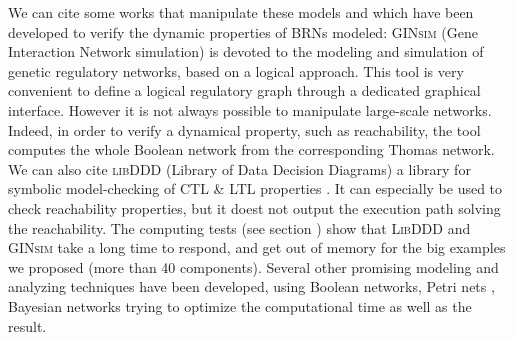 We can cite some works that manipulate these models and which have been developed to verify the dynamic properties of BRNs modeled: \textsc{GINsim} (Gene Interaction Network simulation) \cite{chaouiya2012logical, gonzalez2006ginsim} is devoted to the modeling and simulation of genetic regulatory networks, based on a logical approach. This tool is very convenient  to define a logical regulatory graph through a dedicated graphical interface. However it is not always possible to manipulate large-scale networks. Indeed, in order to verify a dynamical property, such as reachability, the tool computes the whole Boolean network from the corresponding Thomas network.
We can also cite \textsc{libDDD} (Library of Data Decision Diagrams) a library for symbolic model-checking of CTL \& LTL properties \cite{libddd, Kordon09libddd}. It can especially be used to check reachability properties, but it doest not output the execution path solving the reachability. The computing tests (see section ) show that \textsc{LibDDD} and \textsc{GINsim} take a long time to respond, and get out of memory for the big examples we proposed (more than 40 components).  %
Several other promising modeling and analyzing techniques have been developed, using Boolean networks, Petri nets \cite{heljanko2001answer}, Bayesian networks \cite{numata2008partial} trying to optimize the computational time as well as the result. %



